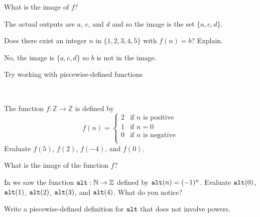 \begin{exam}
\begin{apart}
\begin{soln}
            \end{soln}
        \item What is the image of $f$?
            \begin{soln}
                The actual outputs are $a$, $c$, and $d$ and so the image is the set $\{a,c,d\}$.
            \end{soln}
        \item Does there exist an integer $n$ in $\{1,2,3,4,5\}$ with $f(n) = b$?  Explain.
            \begin{soln}
                No, the image is $\{a,c,d\}$ so $b$ is not in the image.
            \end{soln}
    \end{apart}
\end{exam}

Try working with piecewise-defined functions  

\begin{act}
\label{act_piecewise} 
~    
        \begin{actpart}
            \item The function $f:\mathbb{Z} \to \mathbb{Z}$ is defined by  
            $$f(n) = \left\{ 
            \begin{array} {rl} 
                2 & \text{if } n \text{ is positive} \\ 
                1 & \text{if } n=0 \\ 
                0 & \text{if } n \text{ is negative} \\ 
            \end{array} 
            \right.$$
            Evaluate $f(5)$, $f(2)$, $f(-4)$, and $f(0)$.
            
            \item What is the image of the function $f$?

            \item In  we saw the function $\texttt{alt}: \mathbb{N} \to \mathbb{Z}$ defined by $\texttt{alt}(n) = (-1)^n$. Evaluate $\texttt{alt}(0)$, $\texttt{alt}(1)$, $\texttt{alt}(2)$, $\texttt{alt}(3)$, and $\texttt{alt}(4)$.  What do you notice?

            \item Write a piecewise-defined definition for $\texttt{alt}$ that does not involve powers.
        \end{actpart}
\end{act}

\newcommand{\subfndotgraphs}{Dot Diagrams and Graphs of Functions}

